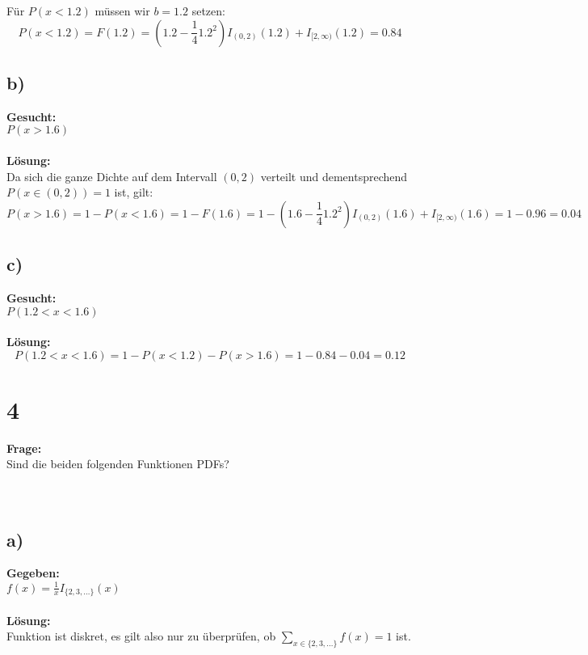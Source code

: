 \documentclass{article}
\begin{document}
Für $P(x < 1.2)$ müssen wir $b = 1.2$ setzen: \[P(x <1.2) = F(1.2) = (1.2-\frac{1}{4}1.2^{2})I_{(0,2)}(1.2) + I_{[2,\infty)}(1.2) = 0.84\]

\subsection*{b)} 
\textbf{Gesucht: } \\

$P(x >1.6)$\\ \\
\textbf{Lösung:} \\

Da sich die ganze Dichte auf dem Intervall $(0,2)$ verteilt und dementsprechend $P(x \in (0,2)) = 1$ ist, gilt:
\[
P(x>1.6) = 1 - P(x<1.6) = 1 - F(1.6)  = 1 - (1.6-\frac{1}{4}1.2^{2})I_{(0,2)}(1.6) + I_{[2,\infty)}(1.6) = 1 - 0.96 = 0.04
\] 

\subsection*{c)} 
\textbf{Gesucht: } \\

$P(1.2 < x < 1.6)$\\ \\
\textbf{Lösung:} \\
\[
P(1.2 < x < 1.6) = 1 - P(x < 1.2) - P(x>1.6) = 1 - 0.84 - 0.04 = 0.12
\]

\section*{4}
\textbf{Frage:} \\


Sind die beiden folgenden Funktionen PDFs? \\ \\ \\

\subsection*{a)}
\textbf{Gegeben:} \\

    $f(x) = \frac{1}{x}I_{\{2,3, \ldots\}}(x)$ \\ \\ 
\textbf{Lösung:}\\


Funktion ist diskret, es gilt also nur zu überprüfen, ob $\sum_{x \in \{2,3, \ldots \}}f(x) = 1$ ist.
\end{document}
